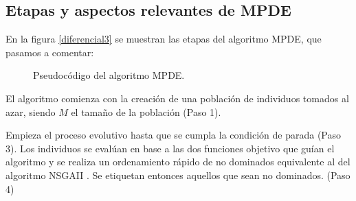 \subsection{Etapas y aspectos relevantes de MPDE}
\noindent En la figura \ref{diferencial3} se muestran las etapas del algoritmo MPDE, que
pasamos a comentar:

\begin{figure}[!htp]
\centering
{}
\caption{Pseudocódigo del algoritmo MPDE.}
\label{diferencial4}
\end{figure}

El algoritmo comienza con la creación de una población de individuos tomados al azar,
siendo $M$ el tamaño de la población (Paso 1).

Empieza el proceso evolutivo hasta que se cumpla la condición de parada (Paso 3). Los
individuos se evalúan en base a las dos funciones objetivo que guían el algoritmo y se
realiza un ordenamiento rápido de no dominados equivalente al del algoritmo NSGAII
\cite{Deb2002}. Se etiquetan entonces aquellos que sean no dominados. (Paso 4)

